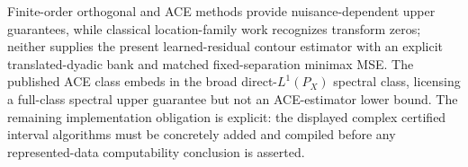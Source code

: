 Finite-order orthogonal and ACE methods provide nuisance-dependent upper guarantees, while classical location-family work recognizes transform zeros; neither supplies the present learned-residual contour estimator with an explicit translated-dyadic bank and matched fixed-separation minimax MSE. The published ACE class embeds in the broad direct-\(L^1(P_X)\) spectral class, licensing a full-class spectral upper guarantee but not an ACE-estimator lower bound. The remaining implementation obligation is explicit: the displayed complex certified interval algorithms must be concretely added and compiled before any represented-data computability conclusion is asserted.